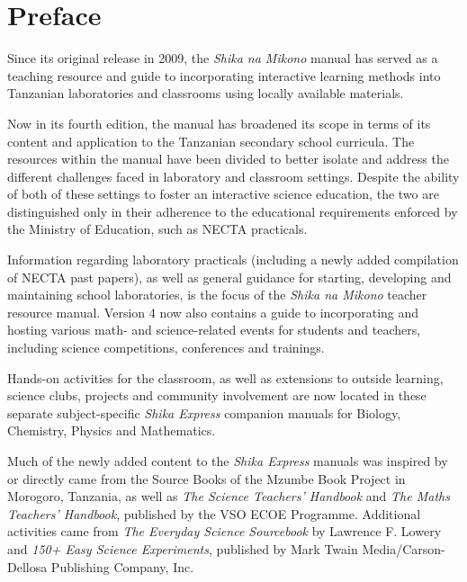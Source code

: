 \clearpage
{}
{}
\chapter*{Preface}


Since its original release in 2009, the \emph{Shika na Mikono} manual has served as a teaching resource and guide to incorporating interactive learning methods into Tanzanian laboratories and classrooms using locally available materials. 

Now in its fourth edition, the manual has broadened its scope in terms of its content and application to the Tanzanian secondary school curricula. The resources within the manual have been divided to better isolate and address the different challenges faced in laboratory and classroom settings. Despite the ability of both of these settings to foster an interactive science education, the two are distinguished only in their adherence to the educational requirements enforced by the Ministry of Education, such as NECTA practicals. 

Information regarding laboratory practicals (including a newly added compilation of NECTA past papers), as well as general guidance for starting, developing and maintaining school laboratories, is the focus of the \emph{Shika na Mikono} teacher resource manual. Version 4 now also contains a guide to incorporating and hosting various math- and science-related events for students and teachers, including science competitions, conferences and trainings. 

Hands-on activities for the classroom, as well as extensions to outside learning, science clubs, projects and community involvement are now located in these separate subject-specific \emph{Shika Express} companion manuals for Biology, Chemistry, Physics and Mathematics.

Much of the newly added content to the \emph{Shika Express} manuals was inspired by or directly came from the Source Books of the Mzumbe Book Project in Morogoro, Tanzania, as well as \emph{The Science Teachers' Handbook} and \emph{The Maths Teachers' Handbook}, published by the VSO ECOE Programme. Additional activities came from \emph{The Everyday Science Sourcebook} by Lawrence F. Lowery and \emph{150+ Easy Science Experiments}, published by Mark Twain Media/Carson-Dellosa Publishing Company, Inc.


